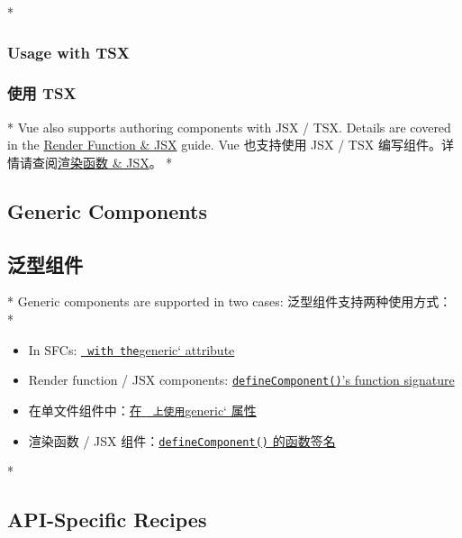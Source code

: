\begin{paracol}{2} 
 
\switchcolumn[0]*%
\subsubsection{Usage with TSX}
\switchcolumn
\subsubsection{使用 TSX}
\switchcolumn[0]*%
Vue also supports authoring components with JSX / TSX. Details are
covered in the
\href{https://vuejs.org/guide/extras/render-function.html\#jsx-tsx}{Render
Function \& JSX} guide.
\switchcolumn
Vue 也支持使用 JSX / TSX
编写组件。详情请查阅\href{https://cn.vuejs.org/guide/extras/render-function.html\#jsx-tsx}{渲染函数
\& JSX}。
\switchcolumn[0]*%
\subsection{Generic Components}
\switchcolumn
\subsection{泛型组件}
\switchcolumn[0]*%
Generic components are supported in two cases:
\switchcolumn
泛型组件支持两种使用方式：
\switchcolumn[0]*%
\begin{itemize}
\item
  In SFCs:
  \href{https://vuejs.org/api/sfc-script-setup.html\#generics}{\texttt{\textasciigrave{}\ with\ the}generic`
  attribute}
\item
  Render function / JSX components:
  \href{https://vuejs.org/api/general.html\#function-signature}{\texttt{defineComponent()}'s
  function signature}
\end{itemize}
\switchcolumn
\begin{itemize}
\item
  在单文件组件中：\href{https://cn.vuejs.org/api/sfc-script-setup.html\#generics}{在
  \texttt{\textasciigrave{}\ 上使用}generic` 属性}
\item
  渲染函数 / JSX
  组件：\href{https://cn.vuejs.org/api/general.html\#function-signature}{\texttt{defineComponent()}
  的函数签名}
\end{itemize}
\switchcolumn[0]*%
\subsection{API-Specific Recipes}
\switchcolumn

\end{paracol}
